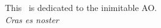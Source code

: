 \begin{center}
    \large This \Doctype\ is dedicated to the inimitable AO.\\
    \large \textit{Cras es noster}
\end{center}
